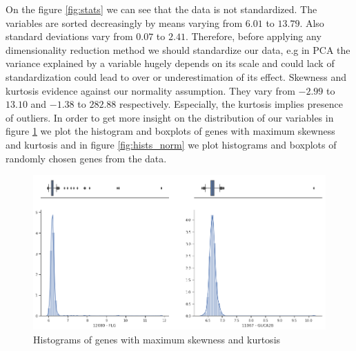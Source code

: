 \documentclass[shortabstract, english, mgr]{iithesis}
\begin{document}
On the figure \ref{fig:stats} we can see that the data is not standardized. The variables are sorted decreasingly by means varying from $6.01$ to $13.79$. Also standard deviations vary from $0.07$ to $2.41$. Therefore, before applying any dimensionality reduction method we should standardize our data, e.g in PCA the variance explained by a variable hugely depends on its scale and could lack of standardization could lead to over or underestimation of its effect. Skewness and kurtosis evidence against our normality assumption. They vary from $-2.99$ to $13.10$ and $-1.38$ to $282.88$ respectively. Especially, the kurtosis implies presence of outliers. In order to get more insight on the distribution of our variables in figure \ref{fig:hists_out} we plot the histogram and boxplots of genes with maximum skewness and kurtosis and in figure \ref{fig:hists_norm} we plot histograms and boxplots of randomly chosen genes from the data. 

\begin{figure}
\centering
\includegraphics[width=\textwidth]{images/hists_ouliers.png}
\caption{Histograms of genes with maximum skewness and kurtosis}
\label{fig:hists_out}
\end{figure}
\end{document}
